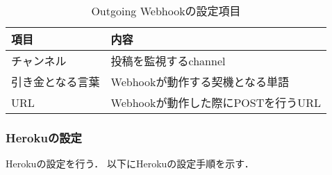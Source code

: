 \documentclass[12pt]{jsarticle}
\begin{document}
\begin{table}
  \begin{center}
    \caption{Outgoing Webhookの設定項目}\label{tab:setting Outgoing Webhook}
    \ecaption{}
    \begin{tabular}{l|l}
      \hline
      \hline
      項目 & 内容\\
      \hline
      チャンネル & 投稿を監視するchannel\\
      引き金となる言葉 & Webhookが動作する契機となる単語\\
      URL & Webhookが動作した際にPOSTを行うURL\\
      \hline
    \end{tabular}
  \end{center}
\end{table}

\subsubsection{Herokuの設定}\label{subsubsec:setting Heroku}
Herokuの設定を行う．
以下にHerokuの設定手順を示す．
\end{document}
